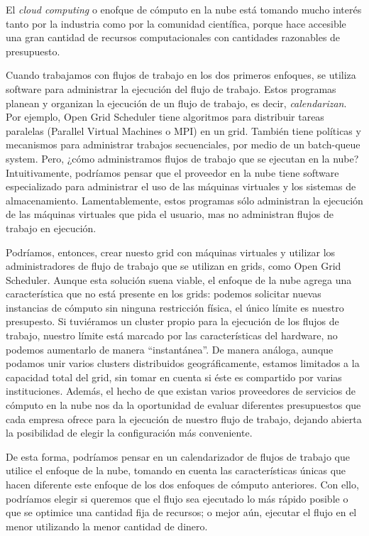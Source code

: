 \documentclass{article}
\begin{document}
El \emph{cloud computing} o enofque de cómputo en la nube está tomando mucho interés tanto por la industria como por la comunidad científica, porque hace accesible una gran cantidad de recursos computacionales con cantidades razonables de presupuesto.

Cuando trabajamos con flujos de trabajo en los dos primeros enfoques, se utiliza software para administrar la ejecución del flujo de trabajo. Estos programas planean y organizan la ejecución de un flujo de trabajo, es decir, \emph{calendarizan}. Por ejemplo, Open Grid Scheduler tiene algoritmos para distribuir tareas paralelas (Parallel Virtual Machines o MPI) en un grid. También tiene políticas y mecanismos para administrar trabajos secuenciales, por medio de un batch-queue system. Pero, ¿cómo administramos flujos de trabajo que se ejecutan en la nube? Intuitivamente, podríamos pensar que el proveedor en la nube tiene software especializado para administrar el uso de las máquinas virtuales y los sistemas de almacenamiento. Lamentablemente, estos programas sólo administran la ejecución de las máquinas virtuales que pida el usuario, mas no administran flujos de trabajo en ejecución. 

Podríamos, entonces, crear nuesto grid con máquinas virtuales y utilizar los administradores de flujo de trabajo que se utilizan en grids, como Open Grid Scheduler. Aunque esta solución suena viable, el enfoque de la nube agrega una característica que no está presente en los grids: podemos solicitar nuevas instancias de cómputo sin ninguna restricción física, el único límite es nuestro presupesto. Si tuviéramos un cluster propio para la ejecución de los flujos de trabajo, nuestro límite está marcado por las características del hardware, no podemos aumentarlo de manera ``instantánea''. De manera análoga, aunque podamos unir varios clusters distribuidos geográficamente, estamos limitados a la capacidad total del grid, sin tomar en cuenta si éste es compartido por varias instituciones. Además, el hecho de que existan varios proveedores de servicios de cómputo en la nube nos da la oportunidad de evaluar diferentes presupuestos que cada empresa ofrece para la ejecución de nuestro flujo de trabajo, dejando abierta la posibilidad de elegir la configuración más conveniente.

De esta forma, podríamos pensar en un calendarizador de flujos de trabajo que utilice el enfoque de la nube, tomando en cuenta las características únicas que hacen diferente este enfoque de los dos enfoques de cómputo anteriores. Con ello, podríamos elegir si queremos que el flujo sea ejecutado lo más rápido posible o que se optimice una cantidad fija de recursos; o mejor aún, ejecutar el flujo en el menor utilizando la menor cantidad de dinero.
\end{document}
